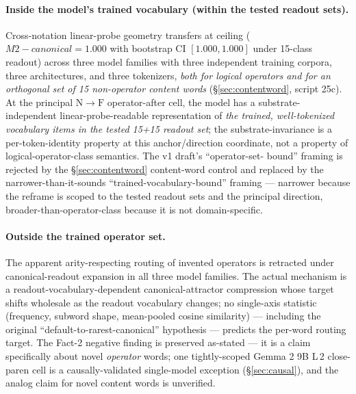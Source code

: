 \documentclass[11pt,letterpaper]{article}
\newcommand{\NtoF}{\ensuremath{\mathrm{N}\!\to\!\mathrm{F}}}
\newcommand{\Mc}{M2-canonical}
\begin{document}
\paragraph{Inside the model's trained vocabulary (within the tested
readout sets).} Cross-notation linear-probe geometry transfers at
ceiling ($\Mc = 1.000$ with bootstrap CI $[1.000, 1.000]$ under
15-class readout) across three model families with three independent
training corpora, three architectures, and three tokenizers,
\emph{both for logical operators and for an orthogonal set of 15
non-operator content words} (\S\ref{sec:contentword}, script 25c).
At the principal \NtoF{} operator-after cell, the model has a
substrate-independent linear-probe-readable representation of
\emph{the trained, well-tokenized vocabulary items in the tested
15+15 readout set}; the substrate-invariance is a per-token-identity
property at this anchor/direction coordinate, not a property of
logical-operator-class semantics. The v1 draft's ``operator-set-
bound'' framing is rejected by the \S\ref{sec:contentword}
content-word control and replaced by the narrower-than-it-sounds
``trained-vocabulary-bound'' framing --- narrower because the
reframe is scoped to the tested readout sets and the principal
direction, broader-than-operator-class because it is not
domain-specific.

\paragraph{Outside the trained operator set.} The apparent
arity-respecting routing of invented operators is retracted under
canonical-readout expansion in all three model families. The actual
mechanism is a readout-vocabulary-dependent canonical-attractor
compression whose target shifts wholesale as the readout vocabulary
changes; no single-axis statistic (frequency, subword shape,
mean-pooled cosine similarity) --- including the original
``default-to-rarest-canonical'' hypothesis --- predicts the per-word
routing target. The Fact-2 negative finding is preserved as-stated
--- it is a claim specifically about novel \emph{operator} words;
one tightly-scoped Gemma 2 9B L\,2 close-paren cell is a
causally-validated single-model exception (\S\ref{sec:causal}), and
the analog claim for novel content words is unverified.
\end{document}
